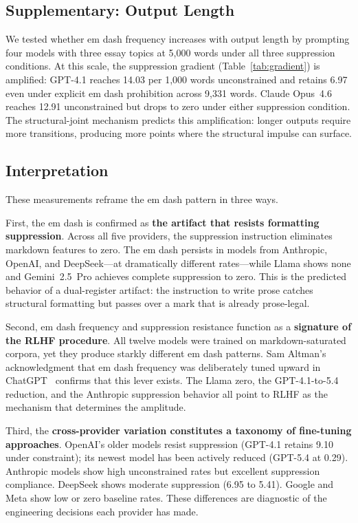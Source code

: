 \subsection{Supplementary: Output Length}

We tested whether em dash frequency increases with output length by prompting four models with three essay topics at 5,000 words under all three suppression conditions. At this scale, the suppression gradient (Table~\ref{tab:gradient}) is amplified: GPT-4.1 reaches 14.03 per 1,000 words unconstrained and retains 6.97 even under explicit em dash prohibition across 9,331 words. Claude Opus~4.6 reaches 12.91 unconstrained but drops to zero under either suppression condition. The structural-joint mechanism predicts this amplification: longer outputs require more transitions, producing more points where the structural impulse can surface.

\subsection{Interpretation}

These measurements reframe the em dash pattern in three ways.

First, the em dash is confirmed as \textbf{the artifact that resists formatting suppression}. Across all five providers, the suppression instruction eliminates markdown features to zero. The em dash persists in models from Anthropic, OpenAI, and DeepSeek---at dramatically different rates---while Llama shows none and Gemini~2.5~Pro achieves complete suppression to zero. This is the predicted behavior of a dual-register artifact: the instruction to write prose catches structural formatting but passes over a mark that is already prose-legal.

Second, em dash frequency and suppression resistance function as a \textbf{signature of the RLHF procedure}. All twelve models were trained on markdown-saturated corpora, yet they produce starkly different em dash patterns. Sam Altman's acknowledgment that em dash frequency was deliberately tuned upward in ChatGPT~\cite{altman2024emdash} confirms that this lever exists. The Llama zero, the GPT-4.1-to-5.4 reduction, and the Anthropic suppression behavior all point to RLHF as the mechanism that determines the amplitude.

Third, the \textbf{cross-provider variation constitutes a taxonomy of fine-tuning approaches}. OpenAI's older models resist suppression (GPT-4.1 retains 9.10 under constraint); its newest model has been actively reduced (GPT-5.4 at 0.29). Anthropic models show high unconstrained rates but excellent suppression compliance. DeepSeek shows moderate suppression (6.95 to 5.41). Google and Meta show low or zero baseline rates. These differences are diagnostic of the engineering decisions each provider has made.
